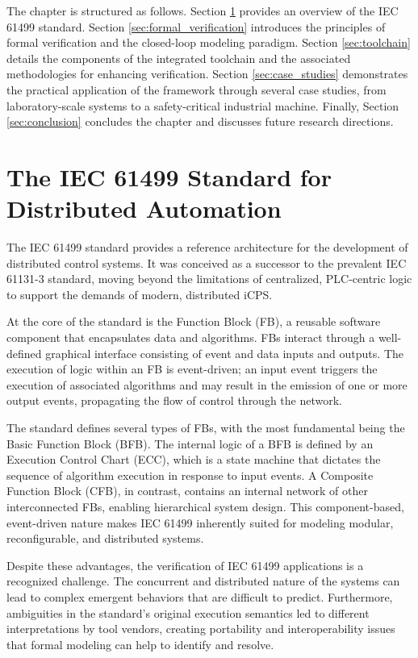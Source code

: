 The chapter is structured as follows. Section \ref{sec:iec61499} provides an overview of the IEC 61499 standard. Section \ref{sec:formal_verification} introduces the principles of formal verification and the closed-loop modeling paradigm. Section \ref{sec:toolchain} details the components of the integrated toolchain and the associated methodologies for enhancing verification. Section \ref{sec:case_studies} demonstrates the practical application of the framework through several case studies, from laboratory-scale systems to a safety-critical industrial machine. Finally, Section \ref{sec:conclusion} concludes the chapter and discusses future research directions.

\section{The IEC 61499 Standard for Distributed Automation}\label{sec:iec61499}

The IEC 61499 standard provides a reference architecture for the development of distributed control systems. It was conceived as a successor to the prevalent IEC 61131-3 standard, moving beyond the limitations of centralized, PLC-centric logic to support the demands of modern, distributed iCPS.

At the core of the standard is the Function Block (FB), a reusable software component that encapsulates data and algorithms. FBs interact through a well-defined graphical interface consisting of event and data inputs and outputs. The execution of logic within an FB is event-driven; an input event triggers the execution of associated algorithms and may result in the emission of one or more output events, propagating the flow of control through the network.

The standard defines several types of FBs, with the most fundamental being the Basic Function Block (BFB). The internal logic of a BFB is defined by an Execution Control Chart (ECC), which is a state machine that dictates the sequence of algorithm execution in response to input events. A Composite Function Block (CFB), in contrast, contains an internal network of other interconnected FBs, enabling hierarchical system design. This component-based, event-driven nature makes IEC 61499 inherently suited for modeling modular, reconfigurable, and distributed systems.

Despite these advantages, the verification of IEC 61499 applications is a recognized challenge. The concurrent and distributed nature of the systems can lead to complex emergent behaviors that are difficult to predict. Furthermore, ambiguities in the standard's original execution semantics led to different interpretations by tool vendors, creating portability and interoperability issues that formal modeling can help to identify and resolve.

